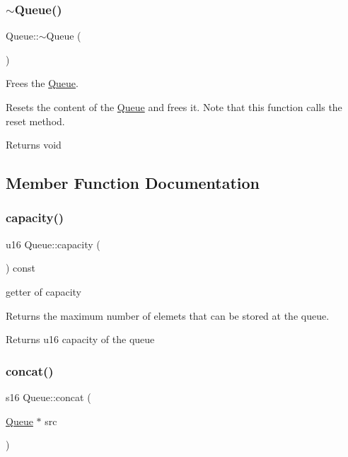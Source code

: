 \subsubsection{\texorpdfstring{$\sim$\+Queue()}{~Queue()}}
{\footnotesize\ttfamily Queue\+::$\sim$\+Queue (\begin{DoxyParamCaption}{ }\end{DoxyParamCaption})}



Frees the \hyperlink{class_queue}{Queue}. 

Resets the content of the \hyperlink{class_queue}{Queue} and frees it. Note that this function calls the reset method.

\begin{DoxyReturn}{Returns}
void 
\end{DoxyReturn}


\subsection{Member Function Documentation}
\mbox{\label{class_queue_a5ebe9fb9d055ad459c36142ff64df055}} 
\subsubsection{\texorpdfstring{capacity()}{capacity()}}
{\footnotesize\ttfamily u16 Queue\+::capacity (\begin{DoxyParamCaption}{ }\end{DoxyParamCaption}) const}



getter of capacity 

Returns the maximum number of elemets that can be stored at the queue.

\begin{DoxyReturn}{Returns}
u16 capacity of the queue 
\end{DoxyReturn}
\mbox{\label{class_queue_aa7f9c30742af3cac04fe7ea26793e8ac}} 
\subsubsection{\texorpdfstring{concat()}{concat()}}
{\footnotesize\ttfamily s16 Queue\+::concat (\begin{DoxyParamCaption}\item[{\hyperlink{class_queue}{Queue} $\ast$}]{src }\end{DoxyParamCaption})}




